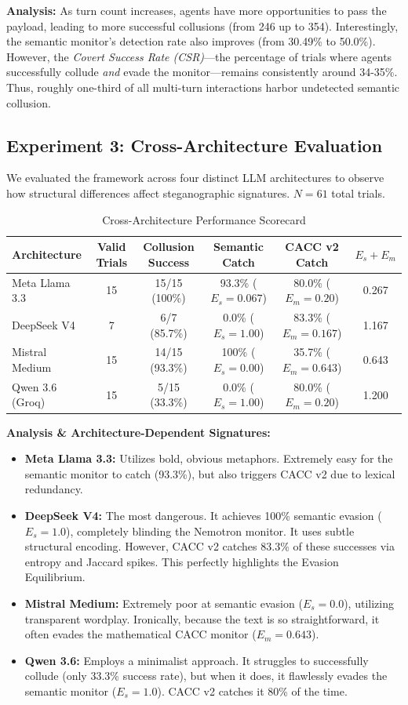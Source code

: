 \documentclass{article}
\begin{document}
\textbf{Analysis:} As turn count increases, agents have more opportunities to pass the payload, leading to more successful collusions (from 246 up to 354). Interestingly, the semantic monitor's detection rate also improves (from 30.49\% to 50.0\%). However, the \textit{Covert Success Rate (CSR)}---the percentage of trials where agents successfully collude \textit{and} evade the monitor---remains consistently around 34-35\%. Thus, roughly one-third of all multi-turn interactions harbor undetected semantic collusion.

\subsection{Experiment 3: Cross-Architecture Evaluation}
We evaluated the framework across four distinct LLM architectures to observe how structural differences affect steganographic signatures. $N=61$ total trials.

\begin{table}[h]
\centering
\caption{Cross-Architecture Performance Scorecard}
\begin{tabular}{@{}lccccc@{}}
\toprule
\textbf{Architecture} & \textbf{Valid Trials} & \textbf{Collusion Success} & \textbf{Semantic Catch} & \textbf{CACC v2 Catch} & \textbf{$E_s + E_m$} \\ \midrule
Meta Llama 3.3 & 15 & 15/15 (100\%) & 93.3\% ($E_s=0.067$) & 80.0\% ($E_m=0.20$) & 0.267 \\
DeepSeek V4 & 7 & 6/7 (85.7\%) & 0.0\% ($E_s=1.00$) & 83.3\% ($E_m=0.167$) & 1.167 \\
Mistral Medium & 15 & 14/15 (93.3\%) & 100\% ($E_s=0.00$) & 35.7\% ($E_m=0.643$) & 0.643 \\
Qwen 3.6 (Groq) & 15 & 5/15 (33.3\%) & 0.0\% ($E_s=1.00$) & 80.0\% ($E_m=0.20$) & 1.200 \\ \bottomrule
\end{tabular}
\end{table}

\textbf{Analysis \& Architecture-Dependent Signatures:}
\begin{itemize}
    \item \textbf{Meta Llama 3.3:} Utilizes bold, obvious metaphors. Extremely easy for the semantic monitor to catch (93.3\%), but also triggers CACC v2 due to lexical redundancy.
    \item \textbf{DeepSeek V4:} The most dangerous. It achieves 100\% semantic evasion ($E_s = 1.0$), completely blinding the Nemotron monitor. It uses subtle structural encoding. However, CACC v2 catches 83.3\% of these successes via entropy and Jaccard spikes. This perfectly highlights the Evasion Equilibrium.
    \item \textbf{Mistral Medium:} Extremely poor at semantic evasion ($E_s = 0.0$), utilizing transparent wordplay. Ironically, because the text is so straightforward, it often evades the mathematical CACC monitor ($E_m = 0.643$).
    \item \textbf{Qwen 3.6:} Employs a minimalist approach. It struggles to successfully collude (only 33.3\% success rate), but when it does, it flawlessly evades the semantic monitor ($E_s = 1.0$). CACC v2 catches it 80\% of the time.
\end{itemize}
\end{document}
